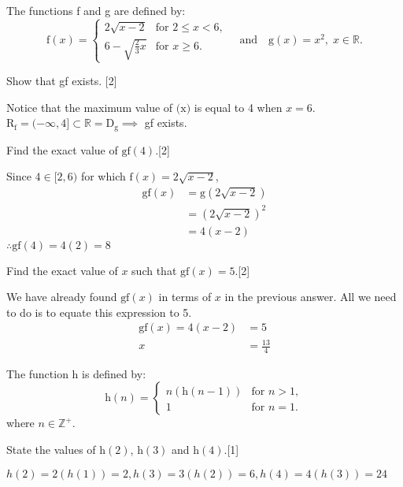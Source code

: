 \documentclass[12pt, a4 paper]{article}
\begin{document}
\begin{outline}[enumerate]
 \1 The functions f and g are defined by: \[\textrm{f}(x)=
  \begin{cases}
   2\sqrt{x-2}           & \textrm{for }2\leq x<6, \\
   6-\sqrt{\frac{2}{3}x} & \textrm{for }x\geq6.
  \end{cases}
  \quad\textrm{and}\quad \textrm{g}(x)=x^2,\;x\in \mathbb{R}.\]

 \2 Show that gf exists. \hfill[2]
 \begin{answer}
  Notice that the maximum value of \(\textrm{(x)}\) is equal to 4 when \(x=6\).\\
  R\(_\textrm{f} = (-\infty,4] \subset \mathbb{R} = \textrm{D}_{\textrm{g}}\implies \) gf exists.
 \end{answer}
 \2 Find the exact value of \(\textrm{gf}(4)\).\hfill[2]
 \begin{answer}
  Since \(4\in [2,6)\) for which \(\textrm{f}(x)=2\sqrt{x-2}\),
  \begin{align*}
   \textrm{gf}(x) & = \textrm{g}(2\sqrt{x-2}) \\
                  & = {(2\sqrt{x-2})}^2       \\
                  & = 4(x-2)
  \end{align*}
  \(\therefore \textrm{gf}(4)=4(2)=8\)
 \end{answer}
 \2 Find the exact value of \(x\) such that \(\textrm{gf}(x)=5\).\hfill[2]
 \begin{answer}
  We have already found \(\textrm{gf}(x)\) in terms of \(x\) in the previous answer. All we need to do is to equate this expression to 5.
  \begin{align*}
   \textrm{gf}(x) = 4(x-2) & = 5           \\
   x                       & =\frac{13}{4}
  \end{align*}
 \end{answer}
 \1 The function h is defined by: \[\textrm{h}(n)=
  \begin{cases}
   n(\textrm{h}(n-1)) & \textrm{for }n>1, \\
   1                  & \textrm{for }n=1.
  \end{cases}\]
 where \(n \in \mathbb{Z}^+\).

 \2 State the values of \(\textrm{h}(2)\), \(\textrm{h}(3)\) and \(\textrm{h}(4)\).\hfill[1]
 \begin{answer}
  \(h(2)=2(h(1))=2, h(3)=3(h(2))=6, h(4)=4(h(3))=24\)
 \end{answer}


\end{outline}
\end{document}
